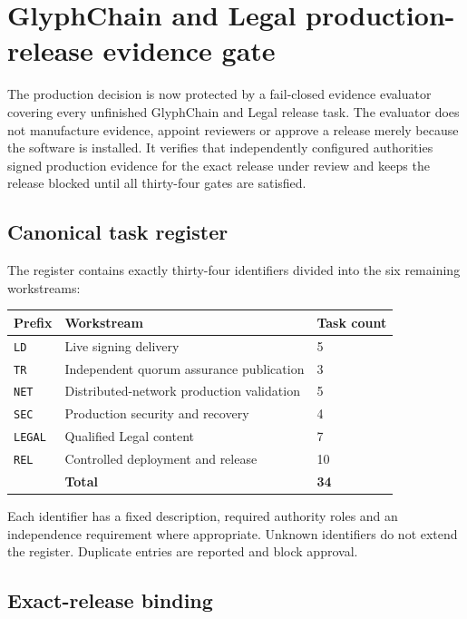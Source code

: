 \section{GlyphChain and Legal production-release evidence gate}
\label{sec:glyphchain-legal-release-evidence-gate}

The production decision is now protected by a fail-closed evidence evaluator
covering every unfinished GlyphChain and Legal release task.  The evaluator does
not manufacture evidence, appoint reviewers or approve a release merely because
the software is installed.  It verifies that independently configured
authorities signed production evidence for the exact release under review and
keeps the release blocked until all thirty-four gates are satisfied.

\subsection{Canonical task register}

The register contains exactly thirty-four identifiers divided into the six
remaining workstreams:

\begin{center}
\begin{tabular}{lll}
\hline
\textbf{Prefix} & \textbf{Workstream} & \textbf{Task count} \\
\hline
\texttt{LD} & Live signing delivery & 5 \\
\texttt{TR} & Independent quorum assurance publication & 3 \\
\texttt{NET} & Distributed-network production validation & 5 \\
\texttt{SEC} & Production security and recovery & 4 \\
\texttt{LEGAL} & Qualified Legal content & 7 \\
\texttt{REL} & Controlled deployment and release & 10 \\
\hline
& \textbf{Total} & \textbf{34} \\
\hline
\end{tabular}
\end{center}

Each identifier has a fixed description, required authority roles and an
independence requirement where appropriate.  Unknown identifiers do not extend
the register.  Duplicate entries are reported and block approval.

\subsection{Exact-release binding}

